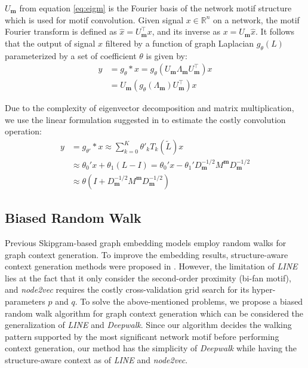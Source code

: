 \documentclass{article}
\theoremstyle{definition}
\begin{document}
$U_{\mathbf{m}}$ from equation \ref{eq:eigm} is the Fourier basis of the 
network motif structure which is used for motif convolution. Given signal
$x \in \mathds{R}^n$ on a network, the motif Fourier transform is defined
as $\hat{x} = U_{\mathbf{m}}^{\top}x$, and its inverse as 
$x = U_{\mathbf{m}}\hat{x}$. It follows that the output of signal $x$
filtered by a function of graph Laplacian $g_{\theta}(L)$ parameterized
by a set of coefficient $\theta$ is given by:
\begin{equation}
\begin{aligned}
y &= g_{\theta} \ast x =  g_\theta (U_{\mathbf{m}} \Lambda_{\mathbf{m}} U_{\mathbf{m}}^\top) x \\
&= U_{\mathbf{m}} (g_\theta(\Lambda_{\mathbf{m}}) U^\top_{\mathbf{m}})x
\end{aligned}
\label{eq:filter}
\end{equation}   

Due to the complexity of eigenvector decomposition and matrix 
multiplication, we use the linear formulation suggested in \cite{gcn} to 
estimate the costly convolution operation: 
\begin{equation} \label{eq:linear}
\begin{aligned}
y &= g_{\theta'} \ast x \approx \sum_{k=0}^K \theta'_k T_k(\tilde{L})x \\
&\approx \theta_0' x + \theta_1 (L - I) = \theta_0' x - \theta_1' D^{-1/2}_{\mathbf{m}}
M^{\mathbf{m}}D^{-1/2}_{\mathbf{m}} \\
&\approx \theta \left( I + D^{-1/2}_{\mathbf{m}}
M^{\mathbf{m}}D^{-1/2}_{\mathbf{m}} \right)
\end{aligned}
\end{equation}

\subsection{Biased Random Walk}

Previous Skipgram-based graph embedding models employ random
walks for graph context generation. To improve the embedding results,
structure-aware context generation methods were proposed in 
\cite{line,node2vec}. However, the limitation of \emph{LINE} lies at the 
fact that it only consider the second-order proximity (bi-fan motif), and  
\emph{node2vec} requires the costly cross-validation grid search for its hyper-
parameters $p$ and $q$. To solve the above-mentioned problems, we propose 
a biased random walk algorithm for graph context generation which can be 
considered the generalization of \emph{LINE} and \emph{Deepwalk}. Since 
our algorithm decides the walking pattern supported by the most significant 
network motif before performing context generation, our method has the 
simplicity of \emph{Deepwalk} while having the structure-aware context as 
of \emph{LINE} and \emph{node2vec}.
\end{document}
